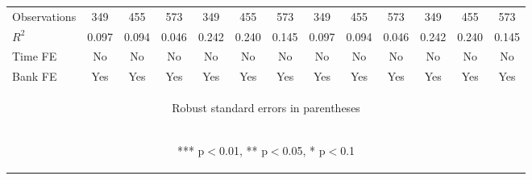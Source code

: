 \documentclass[]{article}
\begin{document}
\begin{center}
\begin{tabular}{lcccccccccccc}
Observations & 349 & 455 & 573 & 349 & 455 & 573 & 349 & 455 & 573 & 349 & 455 & 573 \\
$R^2$ & 0.097 & 0.094 & 0.046 & 0.242 & 0.240 & 0.145 & 0.097 & 0.094 & 0.046 & 0.242 & 0.240 & 0.145 \\
Time FE & No & No & No & No & No & No & No & No & No & No & No & No \\
 Bank FE & Yes & Yes & Yes & Yes & Yes & Yes & Yes & Yes & Yes & Yes & Yes & Yes \\ \hline
\multicolumn{13}{c}{\begin{footnotesize} Robust standard errors in parentheses\end{footnotesize}} \\
\multicolumn{13}{c}{\begin{footnotesize} *** p$<$0.01, ** p$<$0.05, * p$<$0.1\end{footnotesize}} \\
\end{tabular}
\end{center}
\end{document}
